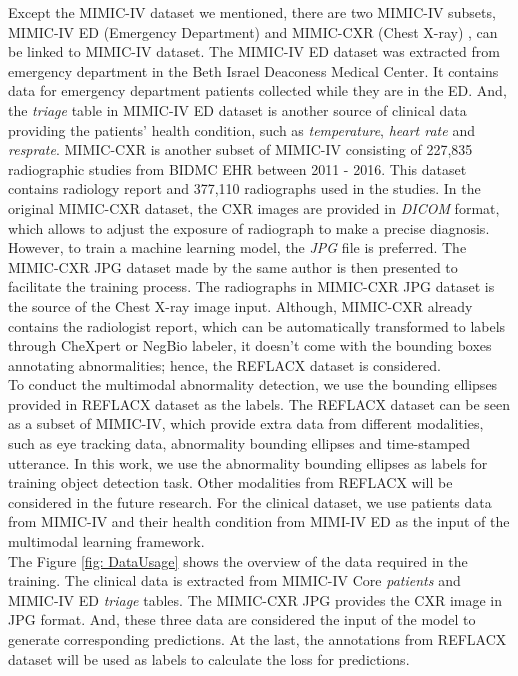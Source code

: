 \documentclass[journal,twoside,web, 11pt]{ieeecolor}
\begin{document}
Except the MIMIC-IV dataset we mentioned, there are two MIMIC-IV subsets, MIMIC-IV ED (Emergency Department) \cite{Johnson2021MIMIC_IV_ED} and MIMIC-CXR (Chest X-ray) \cite{Johnson2019MIMIC_CXR}, can be linked to MIMIC-IV dataset. The MIMIC-IV ED dataset was extracted from emergency department in the Beth Israel Deaconess Medical Center. It contains data for emergency department patients collected while they are in the ED. And, the \textit{triage} table in MIMIC-IV ED dataset is another source of clinical data providing the patients' health condition, such as \textit{temperature}, \textit{heart rate} and \textit{resprate}. MIMIC-CXR is another subset of MIMIC-IV consisting of 227,835 radiographic studies from BIDMC EHR between 2011 - 2016. This dataset contains radiology report and 377,110 radiographs used in the studies. In the original MIMIC-CXR dataset, the CXR images are provided in \textit{DICOM} format, which allows to adjust the exposure of radiograph to make a precise diagnosis. However, to train a machine learning model, the \textit{JPG} file is preferred. The MIMIC-CXR JPG dataset \cite{DJohnson2019MIMIC_CXR_JPG} made by the same author is then presented to facilitate the training process. The radiographs in MIMIC-CXR JPG dataset is the source of the Chest X-ray image input. Although, MIMIC-CXR already contains the radiologist report, which can be automatically transformed to labels through CheXpert \cite{Irvin2019Chexpert} or NegBio \cite{Yifan2017NegBio} labeler, it doesn't come with the bounding boxes annotating abnormalities; hence, the REFLACX dataset \cite{Lanfredi2021REFLACX} is considered. \\

To conduct the multimodal abnormality detection, we use the bounding ellipses provided in REFLACX dataset \cite{Lanfredi2021REFLACX} as the labels. The REFLACX dataset can be seen as a subset of MIMIC-IV, which provide extra data from different modalities, such as eye tracking data, abnormality bounding ellipses and time-stamped utterance. In this work, we use the abnormality bounding ellipses as labels for training object detection task. Other modalities from REFLACX will be considered in the future research. For the clinical dataset, we use patients data from MIMIC-IV and their health condition from MIMI-IV ED as the input of the multimodal learning framework. \\


The Figure \ref{fig: DataUsage} shows the overview of the data required in the training. The clinical data is extracted from MIMIC-IV Core \textit{patients} and MIMIC-IV ED \textit{triage} tables. The MIMIC-CXR JPG provides the CXR image in JPG format. And, these three data are considered the input of the model to generate corresponding predictions. At the last, the annotations from REFLACX dataset will be used as labels to calculate the loss for predictions. \\
\end{document}
